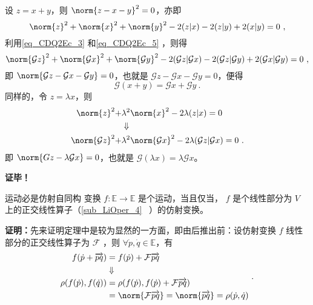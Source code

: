 设 $z=x+y$，则 $\norm{z-x-y}^2=0$，亦即
\begin{equation}
\norm{z}^2+\norm{x}^2+\norm{y}^2-2(z|x)-2(z|y)+2(x|y)=0~,
\end{equation}
利用\autoref{eq_CDQ2Ec_3} 和\autoref{eq_CDQ2Ec_5} ，则得
\begin{equation}
\norm{\mathcal G z}^2+\norm{\mathcal G x}^2+\norm{\mathcal G y}^2-2(\mathcal G z|\mathcal G x)-2(\mathcal G z|\mathcal G y)+2(\mathcal G x|\mathcal G y)=0~,
\end{equation}
即 $\norm{\mathcal G z-\mathcal G x-\mathcal G y}=0$，也就是 $\mathcal G z-\mathcal Gx-\mathcal G y=0$，便得
\begin{equation}
\mathcal G(x+y)=\mathcal G x+\mathcal G y~.
\end{equation}
同样的，令 $z=\lambda x$，则
\begin{equation}
\begin{aligned}
\norm{z}^2+&\lambda^2\norm{x}^2-2\lambda(z|x)=0\\
&\Downarrow\\
\norm{\mathcal G z}^2+&\lambda^2\norm{\mathcal G x}^2-2\lambda(\mathcal G z|\mathcal G x)=0~.
\end{aligned}
\end{equation}
即 $\norm{G z-\lambda\mathcal G x}=0$，也就是 $\mathcal G (\lambda x)=\lambda\mathcal G x$。

\textbf{证毕！}



\begin{theorem}{运动必是仿射自同构}\label{the_CDQ2Ec_1}
变换 $f:\mathbb E\rightarrow\mathbb E$ 是个运动，当且仅当， $f$ 是个线性部分为 $V$ 上的正交线性算子（\autoref{sub_LiOper_4}~ ）的仿射变换。
\end{theorem}
\textbf{证明：}先来证明定理中是较为显然的一方面，即由后推出前：设仿射变换 $f$ 线性部分的正交线性算子为 $\mathcal F$ ，则 $\forall \dot p,\dot q\in\mathbb E$，有
\begin{equation}
\begin{aligned}
f(\dot p+\overrightarrow{pq})&=f(\dot p)+\mathcal F\overrightarrow{pq}\\
&\Downarrow\\
\rho(f(\dot p),f(\dot q))&=\rho(f(\dot p),f(\dot p)+\mathcal F\overrightarrow{pq})\\
&=\norm{\mathcal F\overrightarrow{pq}}=\norm{\overrightarrow{pq}}=\rho(\dot p,\dot q)
\end{aligned}~.
\end{equation}

